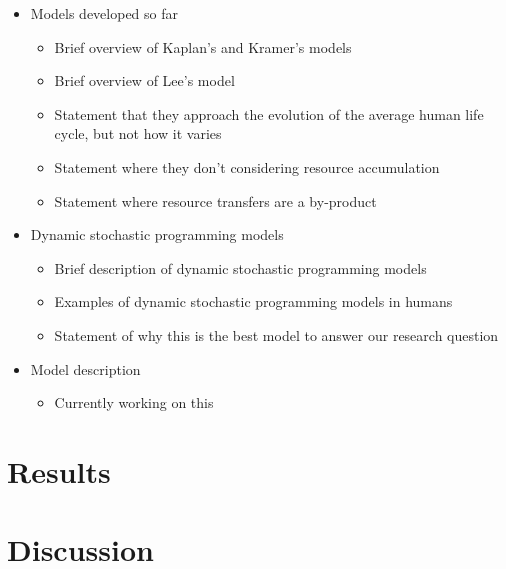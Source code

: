 \documentclass{article}
\begin{document}
\begin{itemize}
    \item Models developed so far
    \begin{itemize}
        \item Brief overview of Kaplan's and Kramer's models
        \item Brief overview of Lee's model
        \item Statement that they approach the evolution of the average human life cycle, but not how it varies
        \item Statement where they don't considering resource accumulation
        \item Statement where resource transfers are a by-product
    \end{itemize}
    \item Dynamic stochastic programming models
    \begin{itemize}
        \item Brief description of dynamic stochastic programming models
        \item Examples of dynamic stochastic programming models in humans
        \item Statement of why this is the best model to answer our research question
    \end{itemize}
    \item Model description
    \begin{itemize}
        \item Currently working on this
    \end{itemize}
\end{itemize}

\section{Results}

\section{Discussion}



\end{document}
